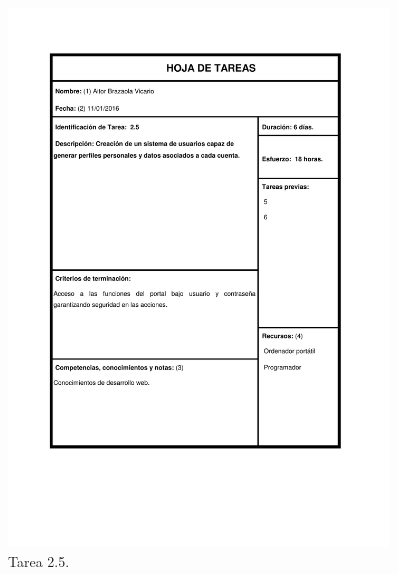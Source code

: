 \documentclass{DeustoFDP}
\begin{document}
\begin{figure}[H]
    \centering
    \includegraphics[width=0.9\textwidth]{fig/Tareas/25}
    \caption{Tarea 2.5.}
    \label{fig:t25}
\end{figure}
\end{document}

